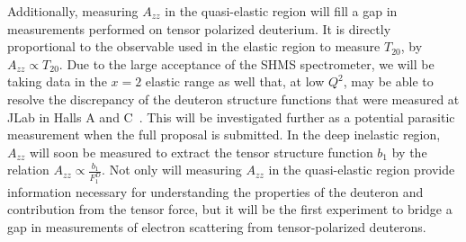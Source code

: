 Additionally, measuring $A_{zz}$ in the quasi-elastic region will fill a gap in measurements performed on tensor polarized deuterium. It is directly proportional to the observable used in the elastic region to measure $T_{20}$, 
by $A_{zz} \propto T_{20}$. Due to the large acceptance of the SHMS spectrometer, we will be taking data in the $x = 2$ elastic range as well that, at low $Q^2$, may be able to resolve the discrepancy of the deuteron structure functions that were measured at JLab in Halls A and C~\cite{Garcon:2001sz}. This will be investigated further as a potential parasitic measurement when the full proposal is submitted.  
In the deep inelastic region, $A_{zz}$ will soon be measured to extract the tensor structure function $b_1$ by the relation $A_{zz} \propto \frac{b_1}{F_1^D}$. Not only will measuring $A_{zz}$ in the quasi-elastic region provide information necessary for understanding the properties of the deuteron and contribution from the tensor force, but it will be the first experiment to bridge a gap in measurements of electron scattering from tensor-polarized deuterons.






